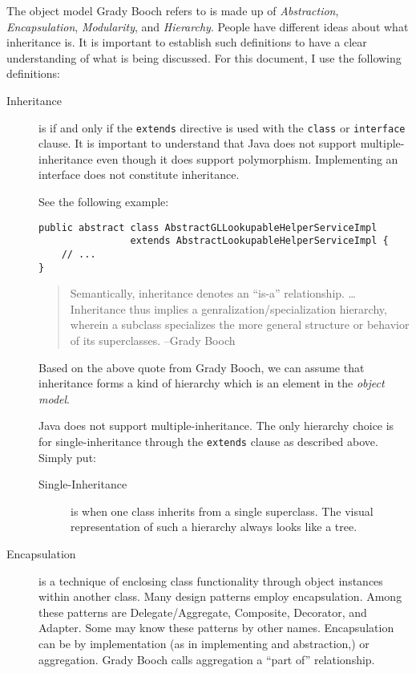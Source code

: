 \documentclass[12pt,notitlepage]{article}
\begin{document}
  The object model Grady Booch refers to is made up of \emph{Abstraction}, \emph{Encapsulation}, \emph{Modularity}, and \emph{Hierarchy}.
  People have different ideas about what inheritance is. It is important to establish such definitions to have a clear understanding
  of what is being discussed. For this document, I use the following definitions:
  \begin{description}
    \item[Inheritance] is if and only if the \texttt{extends} directive is used with the \texttt{class} or \texttt{interface} clause. 
      It is important to understand that Java does not support multiple-inheritance even though it does support polymorphism. Implementing 
      an interface does not constitute inheritance. 

      See the following example:
      \begin{verbatim}
public abstract class AbstractGLLookupableHelperServiceImpl 
                extends AbstractLookupableHelperServiceImpl {
    // ...
}
      \end{verbatim}

      \begin{quote}
        Semantically, inheritance denotes an ``is-a'' relationship. \ldots 
        Inheritance thus implies a genralization/specialization hierarchy, 
        wherein a subclass specializes the more general structure or behavior of its superclasses. --Grady Booch ~\cite{gbtwo}
      \end{quote}
      
      Based on the above quote from Grady Booch, we can assume that inheritance forms a kind of hierarchy which is an element in the 
      \emph{object model}.

      Java does not support multiple-inheritance. The only hierarchy choice is for single-inheritance through the \texttt{extends} clause as
      described above. Simply put:
      \begin{description}
      \item[Single-Inheritance] is when one class inherits from a single superclass. The visual representation of such a hierarchy always looks
        like a tree.
      \end{description}

    \item[Encapsulation] is a technique of enclosing class functionality through object instances within another class. Many 
      design patterns employ encapsulation. Among these patterns are Delegate/Aggregate, Composite, Decorator, and Adapter. Some may know these
      patterns by other names. Encapsulation can be by implementation (as in implementing and abstraction,) or aggregation.  Grady Booch 
      calls aggregation a ``part of'' relationship.
  \end{description}
\end{document}
